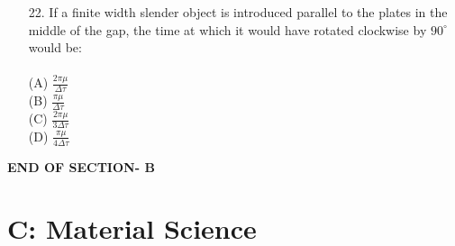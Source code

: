 \documentclass[journal,12pt,onecolumn]{IEEEtran}
\begin{document}
\begin{enumerate}
\item[22.] If a finite width slender object is introduced parallel to the plates in the middle of the gap, the time at which it would have rotated clockwise by $90^\circ$ would be:\\
\vspace{0.2cm}
\hfill{} \\
(A) $\frac{2\pi\mu}{\Delta\tau}$\\
(B) $\frac{\pi\mu}{\Delta\tau}$\\
(C) $\frac{2\pi\mu}{3\Delta\tau}$\\
(D) $\frac{\pi\mu}{4\Delta\tau}$

\end{enumerate}

\vspace{1\baselineskip}
    \begin{center}
    \textbf{\Large END OF SECTION- B}
    \end{center}


\newpage
\section{C: Material Science}
\end{document}
